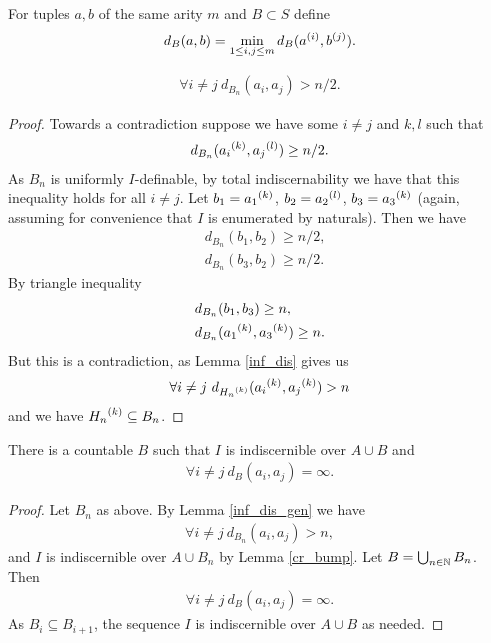 \begin{Definition}
  For tuples $a,b$ of the same arity $m$ and $B \subset S$ define
  \begin{align*}
    d_B(a,b) = \min_{1 \leq i,j \leq m} d_B({a}^{(i)}, {b}^{(j)}).
  \end{align*}
\end{Definition}

\begin{Lemma} \label{inf_dis_gen}
  \begin{align*}
    \forall i \neq j \ d_{B_n}(a_i, a_j) > n/2.
  \end{align*}
\end{Lemma}

\begin{proof}
  Towards a contradiction suppose we have some $i \neq j$ and $k, l$ such that
  \begin{align*}
    d_{B_n}({a_i}^{(k)}, {a_j}^{(l)}) \geq n/2.
  \end{align*}
  As $B_n$ is uniformly $I$-definable, by total indiscernability we have that this inequality holds for all $i \neq j$.
  Let $b_1 = {a_1}^{(k)}$, $b_2 = {a_2}^{(l)}$, $b_3 = {a_3}^{(k)}$ (again, assuming for convenience that $I$ is enumerated by naturals).
  Then we have
  \begin{align*}
    &d_{B_n}(b_1, b_2) \geq n/2, \\
    &d_{B_n}(b_3, b_2) \geq n/2.
  \end{align*}
  By triangle inequality
  \begin{align*}
    &d_{B_n}(b_1, b_3) \geq n, \\
    &d_{B_n}({a_1}^{(k)}, {a_3}^{(k)}) \geq n.
  \end{align*}
  But this is a contradiction, as Lemma \ref{inf_dis} gives us
  \begin{align*}
    \forall i \neq j \ d_{{H_n}^{(k)}}({a_i}^{(k)}, {a_j}^{(k)}) > n
  \end{align*}
  and we have ${H_n}^{(k)} \subseteq B_n$.
\end{proof}

\begin{Corollary} \label{inf_dis}
  There is a countable $B$ such that $I$ is indiscernible over $A \cup B$ and
  \begin{align*}
    \forall i \neq j \ d_B(a_i, a_j) = \infty.
  \end{align*}
\end{Corollary}

\begin{proof}
  Let $B_n$ as above. By Lemma \ref{inf_dis_gen} we have 
  \begin{align*}
    \forall i \neq j \ d_{B_n}(a_i, a_j) > n,
  \end{align*}
  and $I$ is indiscernible over $A \cup B_n$ by Lemma \ref{cr_bump}.
  Let $B = \bigcup_{n \in \mathbb{N}} B_n$.
  Then
  \begin{align*}
    \forall i \neq j \ d_{B}(a_i, a_j) = \infty.
  \end{align*}
  As $B_i \subseteq B_{i+1}$, the sequence $I$ is indiscernible over $A \cup B$ as needed.
\end{proof}

